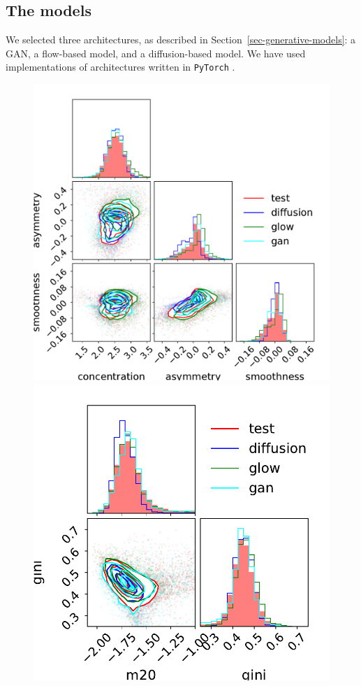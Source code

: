 \documentclass[fleqn,usenatbib]{mnras}
\begin{document}
\subsection{The models}
\label{sec-Exp-Models}
%
We selected three architectures, as described in Section~\ref{sec-generative-models}: a GAN, a flow-based model, and a diffusion-based model. We have used implementations of architectures written in \texttt{PyTorch} \citep{PyTorch2019}. 

\begin{figure}
    \centering
		\includegraphics[width=\linewidth]{fig-CAS-All_100000.pdf}\\
		\includegraphics[width=0.7\linewidth]{figures/fig-gini-m20-All_100000.pdf}

\end{figure}
\end{document}
